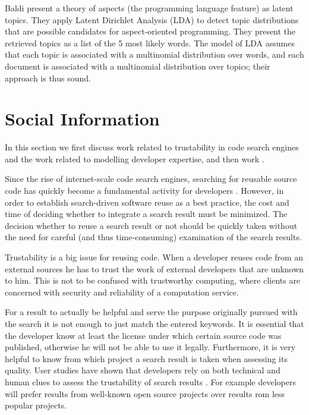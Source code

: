 Baldi \etal \cite{Bald08a} present a theory of aspects (the programming language feature) as latent topics. They apply Latent Dirichlet Analysis (LDA) to detect topic distributions that are possible candidates for aspect-oriented programming. They present the retrieved topics as a list of the 5 most likely words. The model of LDA assumes that each topic is associated with a multinomial distribution over words, and each document is associated with a multinomial distribution over topics; their approach is thus sound.


\section{Social Information}

In this section we first discuss work related to trustability in code search engines and the work related to modelling developer expertise, and then work .

Since the rise of internet-scale code search engines, searching for reusable source code has quickly become a fundamental activity for developers \cite{Kuhn09b}. However, in order to establish search-driven software reuse as a best practice, the cost and time of deciding whether to integrate a search result must be minimized. The decision whether to reuse a search result or not should be quickly taken without the need for careful (and thus time-consuming) examination of the search results.

Trustability is a big issue for reusing code. When a developer reuses code from an external sources he has to trust the work of external developers that are unknown to him. This is not to be confused with trustworthy computing, where clients are concerned with security and reliability of a computation service.

For a result to actually be helpful and serve the purpose originally pursued with the search it is not enough to just match the entered keywords.
It is essential that the developer know at least the license under which certain source code was published, otherwise he will not be able to use it legally. Furthermore, it is very helpful to know from which project a search result is taken when assessing its quality.
User studies have shown that developers rely on both technical and human clues to assess the trustability of search results \cite{Gall09a}. For example developers will prefer results from well-known open source projects over results rom less popular projects.

